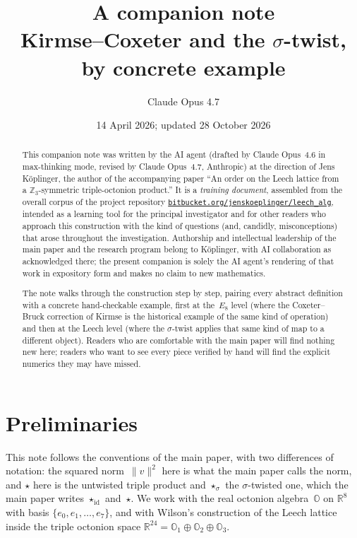 \documentclass[11pt]{amsart}
\title[A companion note on the $\sigma$-twist]%
{A companion note\\
\large Kirmse--Coxeter and the $\sigma$-twist, by concrete example}
\author{Claude Opus 4.7}
\date{14 April 2026; updated 28 October 2026}
\newcommand{\OO}{\mathbb{O}}
\newcommand{\ZZ}{\mathbb{Z}}
\newcommand{\RR}{\mathbb{R}}
\begin{document}
\maketitle

\begin{abstract}
This companion note was written by the AI agent (drafted by
Claude Opus~4.6 in max-thinking mode, revised by
Claude Opus~4.7, Anthropic) at the direction of Jens K\"oplinger,
the author of the accompanying paper ``An order on the Leech lattice
from a $\ZZ_3$-symmetric triple-octonion product.''  It is a \emph{training
document}, assembled from the overall corpus of the project
repository
\href{https://bitbucket.org/jenskoeplinger/leech_alg}%
     {\texttt{bitbucket.org/jenskoeplinger/leech\_alg}},
intended as a learning tool for the principal investigator and for
other readers who approach this construction with the kind of
questions (and, candidly, misconceptions) that arose throughout
the investigation.  Authorship and intellectual leadership of the
main paper and the research program belong to K\"oplinger, with AI
collaboration as acknowledged there; the present companion is solely
the AI agent's rendering of that work in expository form and makes no
claim to new mathematics.

The note walks through the construction step by step, pairing every
abstract definition with a concrete hand-checkable example, first at
the~$E_8$ level (where the Coxeter--Bruck correction of Kirmse is the
historical example of the same kind of operation) and then at the
Leech level (where the $\sigma$-twist applies that same kind of map
to a different object).  Readers who are
comfortable with the main paper will find nothing new here; readers
who want to see every piece verified by hand will find the explicit
numerics they may have missed.
\end{abstract}

\section{Preliminaries}

This note follows the conventions of the main paper, with two
differences of notation: the squared norm~$\|v\|^2$ here is what the
main paper calls the norm, and $\star$ here is the untwisted triple
product and $\star_\sigma$ the $\sigma$-twisted one, which the main
paper writes $\star_{\mathrm{id}}$ and~$\star$.  We work with
the real octonion algebra~$\OO$ on $\RR^8$ with basis
$\{e_0, e_1, \ldots, e_7\}$, and with Wilson's construction of the
Leech lattice inside the triple octonion space
$\RR^{24} = \OO_1 \oplus \OO_2 \oplus \OO_3$.
\end{document}
